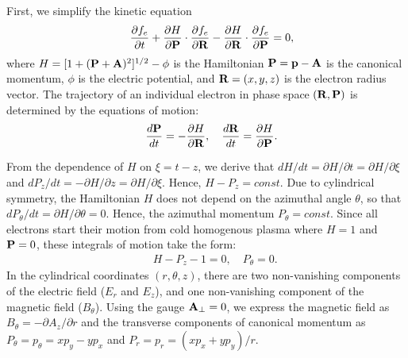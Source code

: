 \documentclass[twocolumn,showpacs,aip]{revtex4}
\begin{document}
First, we simplify the kinetic equation
\begin{eqnarray}
&&\frac{\partial {f}_e}{\partial t} +\frac{\partial H}{\partial {\bf{P}}}\cdot\frac{\partial f_e}{\partial {\bf{R}}}-\frac{\partial H}{\partial {\bf{R}}}\cdot\frac{\partial f_e}{\partial {\bf{P}}}=0,\label{eq:Vlasov_3D}
\end{eqnarray}
where  %
$H=[1+({\bf{P}}+{\bf{A}})^2]^{1/2}-\phi$ is the Hamiltonian 
 ${\bf{P}}={\bf{p}}-{\bf{A}}$ is the canonical momentum, $\phi$ is the electric potential, and ${\bf{R}}=(x,y,z)$ is the electron radius vector.  The trajectory of an individual electron in  phase space $({\bf{R}},{\bf{P}})$ is determined by the equations of motion:
\begin{eqnarray}
&&\frac{d{\bf{P}}}{dt}=-\frac{\partial H}{\partial {\bf{R}}}, \quad \frac{d{\bf{R}}}{dt}=\frac{\partial H}{\partial {\bf{P}}}.
\label{eq:EoM_3D}
\end{eqnarray}

From the dependence of $H$ on $\xi=t-z$, we derive that $dH/dt={\partial H}/{\partial t}={\partial H}/{\partial \xi}$  and $dP_z/dt=-{\partial H}/{\partial z}={\partial H}/{\partial \xi}$. Hence, $H-P_z=const$. Due to cylindrical symmetry, the  Hamiltonian $H$ does not depend on the azimuthal angle $\theta$, so that $d{{P}}_{\theta}/dt={\partial H}/{\partial \theta}=0$. Hence, the azimuthal momentum ${{P}}_{\theta}=const$. Since all electrons start their motion from cold homogenous plasma where $H=1$ and ${\bf{P}}=0$, these integrals of motion take the form:
\begin{eqnarray}
&&H-P_z-1=0, \quad P_{\theta}=0.\label{eq:Conser_G}
\end{eqnarray}
In the cylindrical coordinates $(r,\theta,z)$, there are two  non-vanishing components of the electric field ($E_r$ and $E_z$), and one non-vanishing component of the magnetic field ($B_{\theta}$).  Using the   gauge $ {\bf{A}}_{\perp}=0$, we  express the magnetic field as $B_{\theta}=-\partial A_z/\partial r$ and  the transverse components of canonical momentum as ${{P}}_{\theta}= {{p}}_{\theta}=xp_y-yp_x$ and $P_r=p_r=(xp_x+yp_y)/r$.
%
\end{document}
